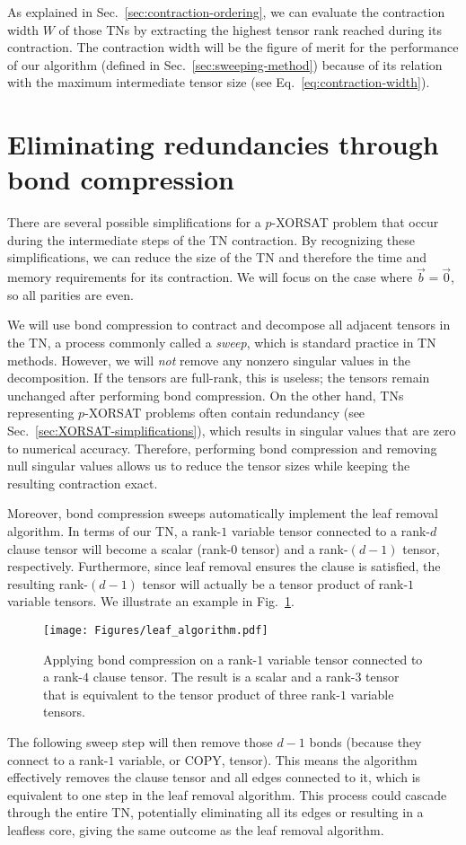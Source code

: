 As explained in Sec.~\ref{sec:contraction-ordering}, we can evaluate the contraction width $W$ of those TNs by extracting the highest tensor rank reached during its contraction.
The contraction width will be the figure of merit for the performance of our algorithm (defined in Sec.~\ref{sec:sweeping-method}) because of its relation with the maximum intermediate tensor size (see Eq.~\ref{eq:contraction-width}).

\section{Eliminating redundancies through bond compression}
There are several possible simplifications for a $p$-XORSAT problem that occur during the intermediate steps of the TN contraction.
By recognizing these simplifications, we can reduce the size of the TN and therefore the time and memory requirements for its contraction.
We will focus on the case where $\vec{b} = \vec{0}$, so all parities are even.

We will use bond compression to contract and decompose all adjacent tensors in the TN, a process commonly called a \emph{sweep}, which is standard practice in TN methods.
However, we will \emph{not} remove any nonzero singular values in the decomposition.
If the tensors are full-rank, this is useless; the tensors remain unchanged after performing bond compression.
On the other hand, TNs representing $p$-XORSAT problems often contain redundancy (see Sec.~\ref{sec:XORSAT-simplifications}), which results in singular values that are zero to numerical accuracy.
Therefore, performing bond compression and removing null singular values allows us to reduce the tensor sizes while keeping the resulting contraction exact.

Moreover, bond compression sweeps automatically implement the leaf removal algorithm.
In terms of our TN, a rank-$1$ variable tensor connected to a rank-$d$ clause tensor will become a scalar (rank-$0$ tensor) and a rank-$(d-1)$ tensor, respectively.
Furthermore, since leaf removal ensures the clause is satisfied, the resulting rank-$(d-1)$ tensor will actually be a tensor product of rank-$1$ variable tensors.
We illustrate an example in Fig.~\ref{fig:degree1_sweep}.
\begin{figure}[htbp]
    \centering
    \texttt{[image: Figures/leaf\_algorithm.pdf]}
    \caption{\label{fig:degree1_sweep}Applying bond compression on a rank-$1$ variable tensor connected to a rank-$4$ clause tensor.
    The result is a scalar and a rank-$3$ tensor that is equivalent to the tensor product of three rank-$1$ variable tensors.}
\end{figure}
The following sweep step will then remove those $d-1$ bonds (because they connect to a rank-$1$ variable, or COPY, tensor).
This means the algorithm effectively removes the clause tensor and all edges connected to it, which is equivalent to one step in the leaf removal algorithm.
This process could cascade through the entire TN, potentially eliminating all its edges or resulting in a leafless core, giving the same outcome as the leaf removal algorithm.

